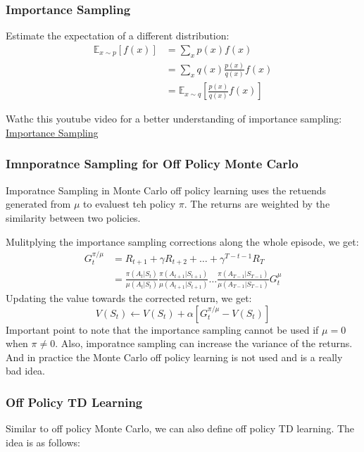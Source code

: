 \subsubsection{Importance Sampling}
Estimate the expectation of a different distribution:
\[
  \begin{aligned}
    \mathbb{E}_{x \sim p}[f(x)] &= \sum_{x} p(x) f(x) \\
    &= \sum_{x} q(x) \frac{p(x)}{q(x)} f(x) \\
    &= \mathbb{E}_{x \sim q} \left[ 
      \frac{p(x)}{q(x)} f(x)
    \right]    
  \end{aligned}
\]
\begin{note}
  Wathc this youtube video for a better understanding of importance sampling:
  \href{https://www.youtube.com/watch?v=C3p2wI4RAi8}{Importance Sampling}
\end{note}

\subsubsection{Imnporatnce Sampling for Off Policy Monte Carlo}
Imporatnce Sampling in Monte Carlo off policy learning uses the retuends generated 
from \(\mu\) to evaluest teh policy \(\pi\). The returns are weighted by the similarity
between two policies.

Mulitplying the importance sampling corrections along the whole episode, we get:
\[
  \begin{aligned}
    G_t^{\pi/\mu}  &= R_{t+1} + \gamma R_{t+2} + \dots + \gamma^{T-t-1} R_{T} \\
    &= \frac{\pi(A_t|S_t)}{\mu(A_t|S_t)} \frac{\pi(A_{t+1}|S_{t+1})}{\mu(A_{t+1}|S_{t+1})}
    \dots \frac{\pi(A_{T-1}|S_{T-1})}{\mu(A_{T-1}|S_{T-1})} G_t^\mu
  \end{aligned}
\]
Updating the value towards the corrected return, we get:
\[
  V(S_t) \leftarrow V(S_t) + \alpha \left[ 
    G_t^{\pi/\mu} - V(S_t)
  \right]
\]
Important point to note that the importance sampling cannot be used if \(\mu =0\) when 
\(\pi \neq 0\). Also, imporatnce sampling can increase the variance of the returns. And in
practice the Monte Carlo off policy learning is not used and is a really bad idea.

\subsubsection{Off Policy TD Learning}
Similar to off policy Monte Carlo, we can also define off policy TD learning. The idea is
as follows:

